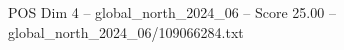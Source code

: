 \begin{textsample}{POS Dim 4 – global\_north\_2024\_06 – Score 25.00 – global\_north\_2024\_06/109066284.txt}
\end{textsample}
